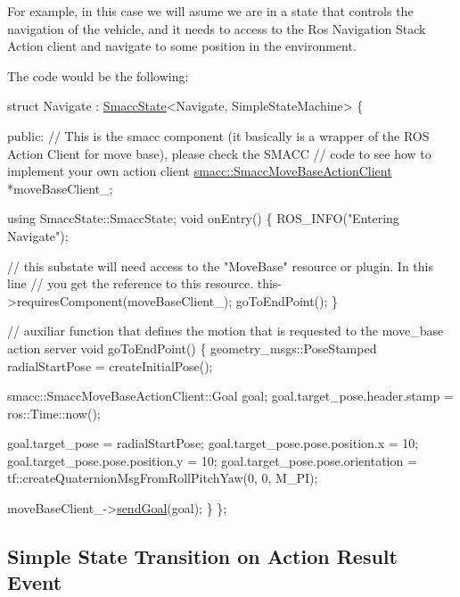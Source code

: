 For example, in this case we will asume we are in a state that controls the navigation of the vehicle, and it needs to access to the Ros Navigation Stack Action client and navigate to some position in the environment.

 

The code would be the following\+:


\begin{DoxyCode}
\textcolor{keyword}{struct }Navigate : \hyperlink{classSmaccState}{SmaccState}<Navigate, SimpleStateMachine> 
\{

\textcolor{keyword}{public}:
  \textcolor{comment}{// This is the smacc component (it basically is a wrapper of the ROS Action Client for move base), please
       check the SMACC}
  \textcolor{comment}{// code to see how to implement your own action client}
  \hyperlink{classsmacc_1_1SmaccMoveBaseActionClient}{smacc::SmaccMoveBaseActionClient} *moveBaseClient\_;

  \textcolor{keyword}{using} SmaccState::SmaccState;
  \textcolor{keywordtype}{void} onEntry()
  \{
    ROS\_INFO(\textcolor{stringliteral}{"Entering Navigate"});

    \textcolor{comment}{// this substate will need access to the "MoveBase" resource or plugin. In this line}
    \textcolor{comment}{// you get the reference to this resource.}
    this->requiresComponent(moveBaseClient\_);
    goToEndPoint();
  \}

  \textcolor{comment}{// auxiliar function that defines the motion that is requested to the move\_base action server}
  \textcolor{keywordtype}{void} goToEndPoint() \{
    geometry\_msgs::PoseStamped radialStartPose = createInitialPose();

    smacc::SmaccMoveBaseActionClient::Goal goal;
    goal.target\_pose.header.stamp = ros::Time::now();

    goal.target\_pose = radialStartPose;
    goal.target\_pose.pose.position.x = 10;
    goal.target\_pose.pose.position.y = 10;
    goal.target\_pose.pose.orientation =
        tf::createQuaternionMsgFromRollPitchYaw(0, 0, M\_PI);

    moveBaseClient\_->\hyperlink{classsmacc_1_1SmaccActionClientBase_a2ec9e5fb96ecc517a815cda209eb1b51}{sendGoal}(goal);
  \}
\};
\end{DoxyCode}


\subsection*{Simple State Transition on Action Result Event}

